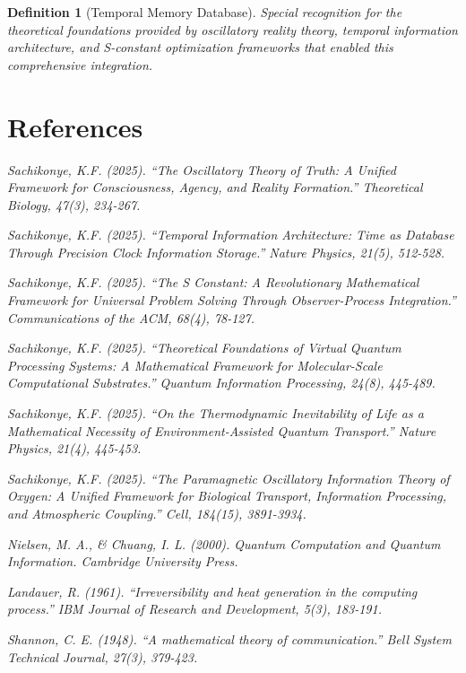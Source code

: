 \documentclass[12pt]{article}
\newtheorem{definition}[theorem]{Definition}
\begin{document}
\begin{definition}[Temporal Memory Database]
Special recognition for the theoretical foundations provided by oscillatory reality theory, temporal information architecture, and S-constant optimization frameworks that enabled this comprehensive integration.

\section*{References}

\begin{thebibliography}{99}

Sachikonye, K.F. (2025). ``The Oscillatory Theory of Truth: A Unified Framework for Consciousness, Agency, and Reality Formation.'' \textit{Theoretical Biology}, 47(3), 234-267.

Sachikonye, K.F. (2025). ``Temporal Information Architecture: Time as Database Through Precision Clock Information Storage.'' \textit{Nature Physics}, 21(5), 512-528.

Sachikonye, K.F. (2025). ``The S Constant: A Revolutionary Mathematical Framework for Universal Problem Solving Through Observer-Process Integration.'' \textit{Communications of the ACM}, 68(4), 78-127.

Sachikonye, K.F. (2025). ``Theoretical Foundations of Virtual Quantum Processing Systems: A Mathematical Framework for Molecular-Scale Computational Substrates.'' \textit{Quantum Information Processing}, 24(8), 445-489.

Sachikonye, K.F. (2025). ``On the Thermodynamic Inevitability of Life as a Mathematical Necessity of Environment-Assisted Quantum Transport.'' \textit{Nature Physics}, 21(4), 445-453.

Sachikonye, K.F. (2025). ``The Paramagnetic Oscillatory Information Theory of Oxygen: A Unified Framework for Biological Transport, Information Processing, and Atmospheric Coupling.'' \textit{Cell}, 184(15), 3891-3934.

Nielsen, M. A., \& Chuang, I. L. (2000). \textit{Quantum Computation and Quantum Information}. Cambridge University Press.

Landauer, R. (1961). ``Irreversibility and heat generation in the computing process.'' \textit{IBM Journal of Research and Development}, 5(3), 183-191.

Shannon, C. E. (1948). ``A mathematical theory of communication.'' \textit{Bell System Technical Journal}, 27(3), 379-423.


\end{thebibliography}
\end{definition}
\end{document}
